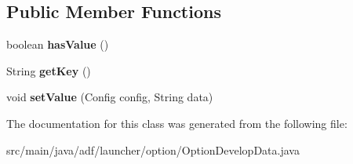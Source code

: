\subsection*{Public Member Functions}
\begin{DoxyCompactItemize}
\item 
\hypertarget{classadf_1_1launcher_1_1option_1_1OptionDevelopData_a614e15aa7842feb932559bf6955cdc95}{}\label{classadf_1_1launcher_1_1option_1_1OptionDevelopData_a614e15aa7842feb932559bf6955cdc95} 
boolean {\bfseries has\+Value} ()
\item 
\hypertarget{classadf_1_1launcher_1_1option_1_1OptionDevelopData_a14926105e891779eea36b54e0f01881a}{}\label{classadf_1_1launcher_1_1option_1_1OptionDevelopData_a14926105e891779eea36b54e0f01881a} 
String {\bfseries get\+Key} ()
\item 
\hypertarget{classadf_1_1launcher_1_1option_1_1OptionDevelopData_abbf9f16c961a032534479722f65ab584}{}\label{classadf_1_1launcher_1_1option_1_1OptionDevelopData_abbf9f16c961a032534479722f65ab584} 
void {\bfseries set\+Value} (Config config, String data)
\end{DoxyCompactItemize}


The documentation for this class was generated from the following file\+:\begin{DoxyCompactItemize}
\item 
src/main/java/adf/launcher/option/Option\+Develop\+Data.\+java\end{DoxyCompactItemize}
